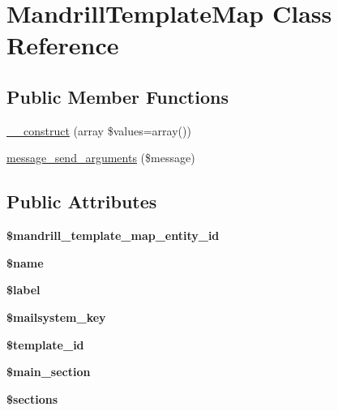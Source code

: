 \hypertarget{classMandrillTemplateMap}{
\section{MandrillTemplateMap Class Reference}
\label{classMandrillTemplateMap}
}
\subsection*{Public Member Functions}
\begin{DoxyCompactItemize}
\item 
\hyperlink{classMandrillTemplateMap_ac983d8fda2727b3a2bdc0a949e9ada98}{\_\-\_\-construct} (array \$values=array())
\item 
\hyperlink{classMandrillTemplateMap_aa73b457572cabc978e552d654ba71579}{message\_\-send\_\-arguments} (\$message)
\end{DoxyCompactItemize}
\subsection*{Public Attributes}
\begin{DoxyCompactItemize}
\item 
\hypertarget{classMandrillTemplateMap_a81c05bca98052a66ac73f926466bc83b}{
{\bfseries \$mandrill\_\-template\_\-map\_\-entity\_\-id}}
\label{classMandrillTemplateMap_a81c05bca98052a66ac73f926466bc83b}

\item 
\hypertarget{classMandrillTemplateMap_af7fa338af7434aaa0f29c0c64231dabf}{
{\bfseries \$name}}
\label{classMandrillTemplateMap_af7fa338af7434aaa0f29c0c64231dabf}

\item 
\hypertarget{classMandrillTemplateMap_ad78a68b0f4372e9a13c1403a79c7bd48}{
{\bfseries \$label}}
\label{classMandrillTemplateMap_ad78a68b0f4372e9a13c1403a79c7bd48}

\item 
\hypertarget{classMandrillTemplateMap_acc7c553c0227eb5e9afd6dee6139124c}{
{\bfseries \$mailsystem\_\-key}}
\label{classMandrillTemplateMap_acc7c553c0227eb5e9afd6dee6139124c}

\item 
\hypertarget{classMandrillTemplateMap_acaf83d11c86c4f23c89798b2d2d46706}{
{\bfseries \$template\_\-id}}
\label{classMandrillTemplateMap_acaf83d11c86c4f23c89798b2d2d46706}

\item 
\hypertarget{classMandrillTemplateMap_ac4812e1d047e3fc0e6dff5a0ee0020f6}{
{\bfseries \$main\_\-section}}
\label{classMandrillTemplateMap_ac4812e1d047e3fc0e6dff5a0ee0020f6}

\item 
\hypertarget{classMandrillTemplateMap_abf698e2e372862ba613d4b1edc98d8ff}{
{\bfseries \$sections}}
\label{classMandrillTemplateMap_abf698e2e372862ba613d4b1edc98d8ff}

\end{DoxyCompactItemize}
